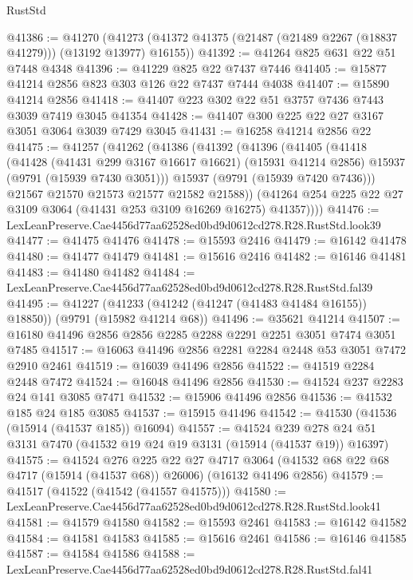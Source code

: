 \begin{lexlean}{RustStd}
\begin{coremodule}
@41386 := @41270
    (@41273 (@41372 @41375 (@21487 (@21489 @2267 (@18837 @41279))) (@13192 @13977) @16155))
@41392 := @41264 @825 @631 @22 @51 @7448 @4348
@41396 := @41229 @825 @22 @7437 @7446
@41405 := @15877 @41214 @2856 @823 @303 @126 @22 @7437 @7444 @4038
@41407 := @15890 @41214 @2856
@41418 := @41407 @223 @302 @22 @51 @3757 @7436 @7443 @3039 @7419 @3045 @41354
@41428 := @41407 @300 @225 @22 @27 @3167 @3051 @3064 @3039 @7429 @3045
@41431 := @16258 @41214 @2856 @22
@41475 := @41257
    (@41262
      (@41386
        (@41392
          (@41396
            (@41405
              (@41418
                (@41428
                  (@41431 @299 @3167 @16617 @16621)
                  (@15931 @41214 @2856)
                  @15937
                  (@9791 (@15939 @7430 @3051)))
                @15937
                (@9791 (@15939 @7420 @7436)))
              @21567
              @21570
              @21573
              @21577
              @21582
              @21588))
          (@41264 @254 @225 @22 @27 @3109 @3064 (@41431 @253 @3109 @16269 @16275) @41357))))
@41476 := LexLeanPreserve.Cae4456d77aa62528ed0bd9d0612cd278.R28.RustStd.look39
@41477 := @41475 @41476
@41478 := @15593 @2416
@41479 := @16142 @41478
@41480 := @41477 @41479
@41481 := @15616 @2416
@41482 := @16146 @41481
@41483 := @41480 @41482
@41484 := LexLeanPreserve.Cae4456d77aa62528ed0bd9d0612cd278.R28.RustStd.fal39
@41495 := @41227
    (@41233 (@41242 (@41247 (@41483 @41484 @16155)) @18850))
    (@9791 (@15982 @41214 @68))
@41496 := @35621 @41214
@41507 := @16180 @41496 @2856 @2856 @2285 @2288 @2291 @2251 @3051 @7474 @3051 @7485
@41517 := @16063 @41496 @2856 @2281 @2284 @2448 @53 @3051 @7472 @2910 @2461
@41519 := @16039 @41496 @2856
@41522 := @41519 @2284 @2448 @7472
@41524 := @16048 @41496 @2856
@41530 := @41524 @237 @2283 @24 @141 @3085 @7471
@41532 := @15906 @41496 @2856
@41536 := @41532 @185 @24 @185 @3085
@41537 := @15915 @41496
@41542 := @41530 (@41536 (@15914 (@41537 @185)) @16094)
@41557 := @41524
    @239
    @278
    @24
    @51
    @3131
    @7470
    (@41532 @19 @24 @19 @3131 (@15914 (@41537 @19)) @16397)
@41575 := @41524
    @276
    @225
    @22
    @27
    @4717
    @3064
    (@41532 @68 @22 @68 @4717 (@15914 (@41537 @68)) @26006)
    (@16132 @41496 @2856)
@41579 := @41517 (@41522 (@41542 (@41557 @41575)))
@41580 := LexLeanPreserve.Cae4456d77aa62528ed0bd9d0612cd278.R28.RustStd.look41
@41581 := @41579 @41580
@41582 := @15593 @2461
@41583 := @16142 @41582
@41584 := @41581 @41583
@41585 := @15616 @2461
@41586 := @16146 @41585
@41587 := @41584 @41586
@41588 := LexLeanPreserve.Cae4456d77aa62528ed0bd9d0612cd278.R28.RustStd.fal41

\end{coremodule}
\end{lexlean}
